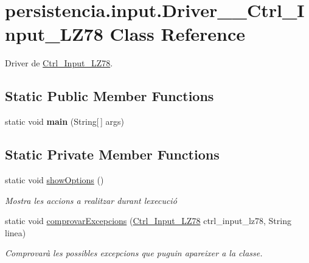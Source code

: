 \hypertarget{classpersistencia_1_1input_1_1Driver____Ctrl__Input__LZ78}{}\section{persistencia.\+input.\+Driver\+\_\+\+\_\+\+Ctrl\+\_\+\+Input\+\_\+\+L\+Z78 Class Reference}
\label{classpersistencia_1_1input_1_1Driver____Ctrl__Input__LZ78}


Driver de \hyperlink{classpersistencia_1_1input_1_1Ctrl__Input__LZ78}{Ctrl\+\_\+\+Input\+\_\+\+L\+Z78}.  


\subsection*{Static Public Member Functions}
\begin{DoxyCompactItemize}
\item 
\mbox{\label{classpersistencia_1_1input_1_1Driver____Ctrl__Input__LZ78_adb756847df72081fa229549543e03569}} 
static void {\bfseries main} (String\mbox{[}$\,$\mbox{]} args)
\end{DoxyCompactItemize}
\subsection*{Static Private Member Functions}
\begin{DoxyCompactItemize}
\item 
\mbox{\label{classpersistencia_1_1input_1_1Driver____Ctrl__Input__LZ78_af3c2d5d864dec2d98d3d57c474f9c2b4}} 
static void \hyperlink{classpersistencia_1_1input_1_1Driver____Ctrl__Input__LZ78_af3c2d5d864dec2d98d3d57c474f9c2b4}{show\+Options} ()
\begin{DoxyCompactList}\small\item\em Mostra les accions a realitzar durant l\textquotesingle{}execució \end{DoxyCompactList}\item 
static void \hyperlink{classpersistencia_1_1input_1_1Driver____Ctrl__Input__LZ78_a285493e74dff1f6b2520f010f75b850c}{comprovar\+Excepcions} (\hyperlink{classpersistencia_1_1input_1_1Ctrl__Input__LZ78}{Ctrl\+\_\+\+Input\+\_\+\+L\+Z78} ctrl\+\_\+input\+\_\+lz78, String linea)
\begin{DoxyCompactList}\small\item\em Comprovarà les possibles excepcions que puguin apareixer a la classe. \end{DoxyCompactList}\end{DoxyCompactItemize}


